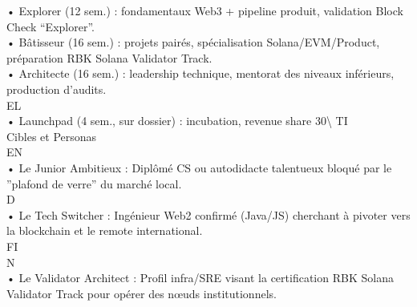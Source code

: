 \documentclass[12pt,landscape,a4paper]{article}
\begin{document}
\vspace{0.5em}
• Explorer (12 sem.) : fondamentaux Web3 + pipeline produit, validation Block Check “Explorer”.\\
\vspace{0.5em}
• Bâtisseur (16 sem.) : projets pairés, spécialisation Solana/EVM/Product, préparation RBK Solana Validator Track.\\
\vspace{0.5em}
• Architecte (16 sem.) : leadership technique, mentorat des niveaux inférieurs, production d’audits.\\
\vspace{0.5em}
\vspace{0.5em}
\vspace{0.5em}
\vspace{0.5em}
EL\\
• Launchpad (4 sem., sur dossier) : incubation, revenue share 30\textbackslash{}%
\vspace{0.5em}
\vspace{0.5em}
\vspace{0.5em}
\vspace{0.5em}
TI\\
Cibles et Personas\\
\vspace{0.5em}
\vspace{0.5em}
\vspace{0.5em}
\vspace{0.5em}
EN\\
• Le Junior Ambitieux : Diplômé CS ou autodidacte talentueux bloqué par le ”plafond de verre” du marché local.\\
\vspace{0.5em}
\vspace{0.5em}
\vspace{0.5em}
\vspace{0.5em}
D\\
• Le Tech Switcher : Ingénieur Web2 confirmé (Java/JS) cherchant à pivoter vers la blockchain et le remote international.\\
\vspace{0.5em}
\vspace{0.5em}
\vspace{0.5em}
\vspace{0.5em}
FI\\
N\\
• Le Validator Architect : Profil infra/SRE visant la certification RBK Solana Validator Track pour opérer des nœuds institutionnels.\\
\end{document}
